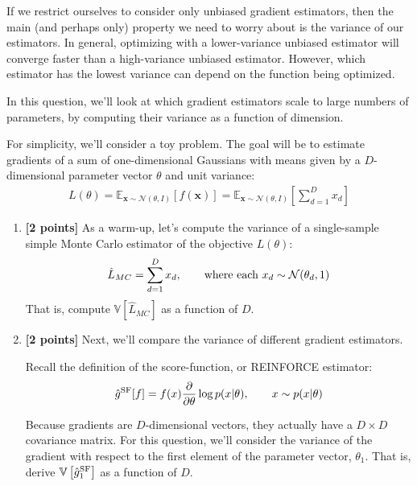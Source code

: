 \documentclass{harvardml}
\newcommand{\bx}{\mathbf{x}}
\newcommand{\distNorm}{\mathcal{N}}
\newcommand{\var}{\mathbb{V}}
\newcommand{\E}{\mathbb{E}}
\newcommand{\PT}{\frac{\partial}{\partial \theta}}
\theoremstyle{plain}
\begin{document}
\begin{problem}

If we restrict ourselves to consider only unbiased gradient estimators, then the main (and perhaps only) property we need to worry about is the variance of our estimators.
In general, optimizing with a lower-variance unbiased estimator will converge faster than a high-variance unbiased estimator.
However, which estimator has the lowest variance can depend on the function being optimized.

In this question, we'll look at which gradient estimators scale to large numbers of parameters, by computing their variance as a function of dimension.

For simplicity, we'll consider a toy problem.
The goal will be to estimate gradients of a sum of one-dimensional Gaussians with means given by a $D$-dimensional parameter vector $\theta$ and unit variance:
%
\begin{align}
L(\theta) 
= \E_{\bx \sim \distNorm(\theta, I)} \left[ f(\bx) \right]
= \E_{\bx \sim \distNorm(\theta, I)} \left[ \sum_{d=1}^D x_d \right]
\end{align}



\begin{enumerate}[label=(\alph*)]
\item {\bf [2 points]} As a warm-up, let's compute the variance of a single-sample simple Monte Carlo estimator of the objective $L(\theta)$:
%
\begin{align}
\hat L_{MC} 
= \sum_{d=1}^D x_d, \qquad \textnormal{where each } x_d \sim \distNorm(\theta_d, 1)
\end{align}
%
That is, compute $\var \left[ \hat L_{MC} \right]$ as a function of $D$.

\item {\bf [2 points]} Next, we'll compare the variance of different gradient estimators.

Recall the definition of the score-function, or REINFORCE estimator:
%
\begin{align}
\hat g^\textnormal{SF}[f] = f(x) \PT \log p(x | \theta), \qquad x \sim p(x | \theta)
\end{align}
%

Because gradients are $D$-dimensional vectors, they actually have a $D \times D$ covariance matrix.
For this question, we'll consider the variance of the gradient with respect to the first element of the parameter vector, $\theta_1$.
%
That is, derive $\var \left[ \hat g^\textnormal{SF}_1 \right]$ as a function of $D$.


\end{enumerate}
\end{problem}
\end{document}
